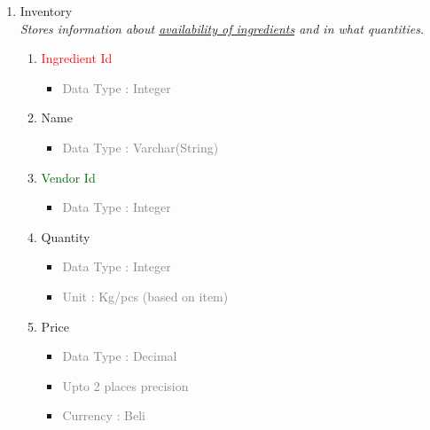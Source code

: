 \begin{enumerate}
        \item Inventory \\
        \textit{Stores information about \underline{availability of ingredients} and in what quantities.}
            \begin{enumerate}[label=\alph*.]
                \item\textcolor{red}{Ingredient Id}
                    \begin{itemize}[label=-]
                        \item \textcolor{gray}{Data Type : Integer}
                    \end{itemize}
                \item Name
                    \begin{itemize}[label=-]
                        \item \textcolor{gray}{Data Type : Varchar(String)}
                    \end{itemize}
                \item \textcolor{darkgreen}{Vendor Id}
                    \begin{itemize}[label=-]
                        \item \textcolor{gray}{Data Type : Integer}
                    \end{itemize}
                \item Quantity
                    \begin{itemize}[label=-]
                        \item \textcolor{gray}{Data Type : Integer}
                        \item \textcolor{gray}{Unit : Kg/pcs (based on item)}
                    \end{itemize}
                \item Price
                    \begin{itemize}[label=-]
                        \item \textcolor{gray}{Data Type : Decimal}
                        \item \textcolor{gray}{Upto 2 places precision}
                        \item \textcolor{gray}{Currency : Beli}
                    \end{itemize}
            \end{enumerate}
        

\end{enumerate}
